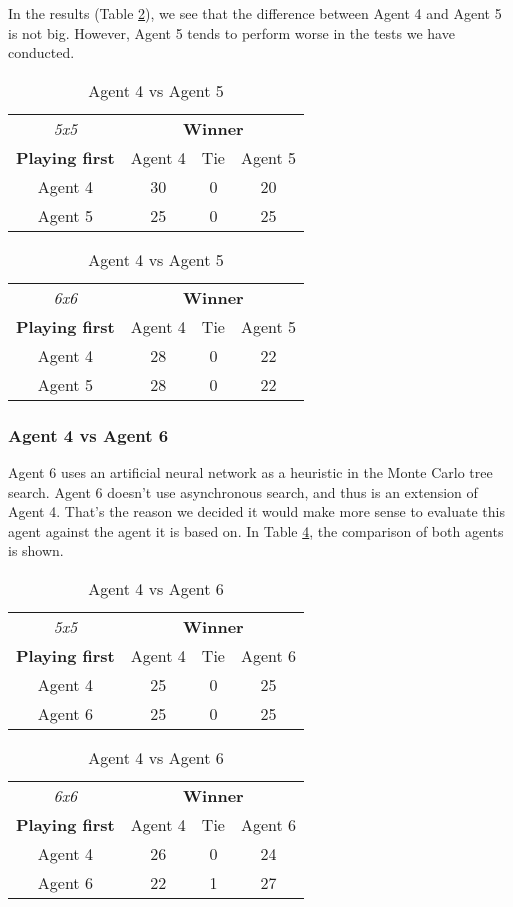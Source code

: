 In the results (Table \ref{result:Ag4vsAg5}), we see that the difference between Agent 4 and Agent 5 is not big. However, Agent 5 tends to perform worse in the tests we have conducted.

\begin{table}[!h]
	\centering
	\begin{tabular}{c | c | c | c}
		\textit{5x5} & \multicolumn{3}{c}{\textbf{Winner}}        \\
		\textbf{Playing first} & Agent 4 & Tie & Agent 5 \\ \hline
		Agent 4 & 30 & 0 & 20 \\ \hline
		Agent 5 & 25 & 0 & 25
	\end{tabular}
	\quad
	\begin{tabular}{c | c | c | c}
		\textit{6x6} & \multicolumn{3}{c}{\textbf{Winner}}        \\
		\textbf{Playing first} & Agent 4 & Tie & Agent 5 \\ \hline
		Agent 4 & 28 & 0 & 22 \\ \hline
		Agent 5 & 28 & 0 & 22
	\end{tabular}
	\caption{\label{result:Ag4vsAg5}Agent 4 vs Agent 5}
\end{table}


\subsubsection{Agent 4 vs Agent 6}
Agent 6 uses an artificial neural network as a heuristic in the Monte Carlo tree search. Agent 6 doesn't use asynchronous search, and thus is an extension of Agent 4. That's the reason we decided it would make more sense to evaluate this agent against the agent it is based on. In Table \ref{result:Ag4vsAg6}, the comparison of both agents is shown.

\begin{table}[!h]
	\centering
	\begin{tabular}{c | c | c | c}
		\textit{5x5} & \multicolumn{3}{c}{\textbf{Winner}}        \\
		\textbf{Playing first} & Agent 4 & Tie & Agent 6 \\ \hline
		Agent 4 & 25 & 0 & 25 \\ \hline
		Agent 6 & 25 & 0 & 25
	\end{tabular}
	\quad
	\begin{tabular}{c | c | c | c}
		\textit{6x6} & \multicolumn{3}{c}{\textbf{Winner}}        \\
		\textbf{Playing first} & Agent 4 & Tie & Agent 6 \\ \hline
		Agent 4 & 26 & 0 & 24 \\ \hline
		Agent 6 & 22 & 1 & 27
	\end{tabular}
	\caption{\label{result:Ag4vsAg6}Agent 4 vs Agent 6}
\end{table}

